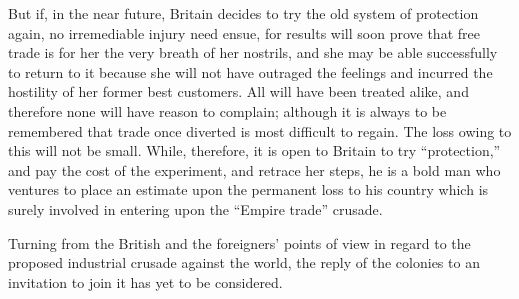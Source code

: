 \documentclass[11pt,openany]{book}
\begin{document}
But if, in the near future, Britain decides to try the old system of protection again, no irremediable injury need ensue, for results will soon prove that free trade is for her the very breath of her nostrils, and she may be able successfully to return to it because she will not have outraged the feelings and incurred the hostility of her former best customers. All will have been treated alike, and therefore none will have reason to complain; although it is always to be remembered that trade once diverted is most difficult to regain. The loss owing to this will not be small. While, therefore, it is open to Britain to try ``protection,'' and pay the cost of the experiment, and retrace her steps, he is a bold man who ventures to place an estimate upon the permanent loss to his country which is surely involved in entering upon the ``Empire trade'' crusade.

Turning from the British and the foreigners' points of view in regard to the proposed industrial crusade against the world, the reply of the colonies to an invitation to join it has yet to be considered.
\end{document}
